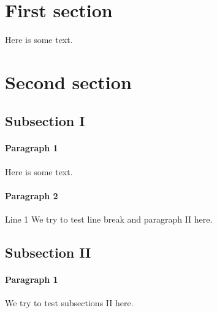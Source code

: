 \documentclass{mockDoc}
\begin{document}
	\section{First section}
		Here is some text.
	\section{Second section}
		\subsection{Subsection I}
			\paragraph{Paragraph 1}
				Here is some text.
			\paragraph{Paragraph 2}
				Line 1\newline 
				We try to test line break and paragraph II here.
			\subsection{Subsection II}
			\paragraph{Paragraph 1}
				We try to test subsections II here.
\end{document}
